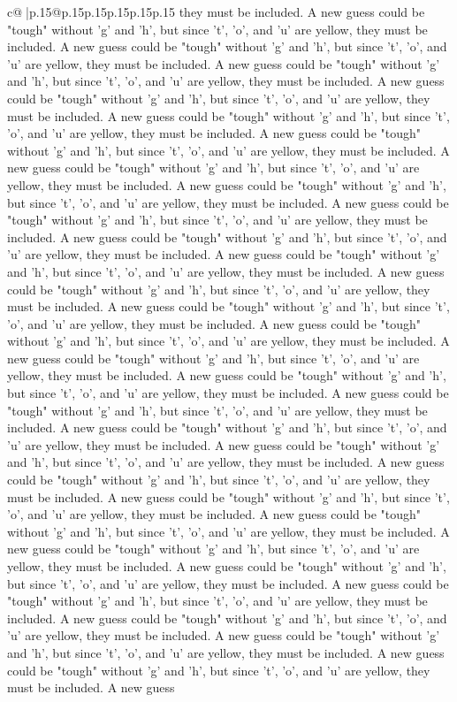 \documentclass{article}
\begin{document}
{\begin{supertabular}{c@{$\;$}|p{.15\linewidth}@{}p{.15\linewidth}p{.15\linewidth}p{.15\linewidth}p{.15\linewidth}p{.15\linewidth}}
{{{they must be included. A new guess could be "tough" without 'g' and 'h', but since 't', 'o', and 'u' are yellow, they must be included. A new guess could be "tough" without 'g' and 'h', but since 't', 'o', and 'u' are yellow, they must be included. A new guess could be "tough" without 'g' and 'h', but since 't', 'o', and 'u' are yellow, they must be included. A new guess could be "tough" without 'g' and 'h', but since 't', 'o', and 'u' are yellow, they must be included. A new guess could be "tough" without 'g' and 'h', but since 't', 'o', and 'u' are yellow, they must be included. A new guess could be "tough" without 'g' and 'h', but since 't', 'o', and 'u' are yellow, they must be included. A new guess could be "tough" without 'g' and 'h', but since 't', 'o', and 'u' are yellow, they must be included. A new guess could be "tough" without 'g' and 'h', but since 't', 'o', and 'u' are yellow, they must be included. A new guess could be "tough" without 'g' and 'h', but since 't', 'o', and 'u' are yellow, they must be included. A new guess could be "tough" without 'g' and 'h', but since 't', 'o', and 'u' are yellow, they must be included. A new guess could be "tough" without 'g' and 'h', but since 't', 'o', and 'u' are yellow, they must be included. A new guess could be "tough" without 'g' and 'h', but since 't', 'o', and 'u' are yellow, they must be included. A new guess could be "tough" without 'g' and 'h', but since 't', 'o', and 'u' are yellow, they must be included. A new guess could be "tough" without 'g' and 'h', but since 't', 'o', and 'u' are yellow, they must be included. A new guess could be "tough" without 'g' and 'h', but since 't', 'o', and 'u' are yellow, they must be included. A new guess could be "tough" without 'g' and 'h', but since 't', 'o', and 'u' are yellow, they must be included. A new guess could be "tough" without 'g' and 'h', but since 't', 'o', and 'u' are yellow, they must be included. A new guess could be "tough" without 'g' and 'h', but since 't', 'o', and 'u' are yellow, they must be included. A new guess could be "tough" without 'g' and 'h', but since 't', 'o', and 'u' are yellow, they must be included. A new guess could be "tough" without 'g' and 'h', but since 't', 'o', and 'u' are yellow, they must be included. A new guess could be "tough" without 'g' and 'h', but since 't', 'o', and 'u' are yellow, they must be included. A new guess could be "tough" without 'g' and 'h', but since 't', 'o', and 'u' are yellow, they must be included. A new guess could be "tough" without 'g' and 'h', but since 't', 'o', and 'u' are yellow, they must be included. A new guess could be "tough" without 'g' and 'h', but since 't', 'o', and 'u' are yellow, they must be included. A new guess could be "tough" without 'g' and 'h', but since 't', 'o', and 'u' are yellow, they must be included. A new guess could be "tough" without 'g' and 'h', but since 't', 'o', and 'u' are yellow, they must be included. A new guess could be "tough" without 'g' and 'h', but since 't', 'o', and 'u' are yellow, they must be included. A new guess could be "tough" without 'g' and 'h', but since 't', 'o', and 'u' are yellow, they must be included. A new guess }}}
\end{supertabular}}
\end{document}
